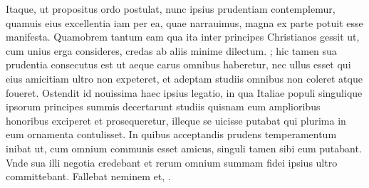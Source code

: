 \documentclass[a5paper,twoside]{article}
\begin{document}
\begin{pages}
\begin{Leftside}
Itaque, ut propositus ordo postulat, nunc ipsius prudentiam contemplemur, quamuis eius excellentia iam per ea, quae narrauimus, magna ex parte potuit esse manifesta. Quamobrem tantum eam   qua ita  inter principes Christianos gessit ut, cum unius erga   consideres, credas ab aliis minime dilectum. ; hic tamen sua prudentia consecutus est ut aeque carus omnibus haberetur, nec ullus esset qui eius amicitiam ultro non expeteret, et adeptam studiis omnibus non coleret atque foueret. Ostendit id nouissima haec ipsius legatio, in qua  Italiae populi singulique ipsorum principes summis decertarunt studiis quisnam eum amplioribus honoribus exciperet et prosequeretur, illeque se uicisse putabat qui plurima in eum ornamenta contulisset. In quibus acceptandis  prudens temperamentum inibat ut, cum omnium communis esset amicus, singuli tamen sibi eum  putabant. Vnde sua illi negotia credebant et rerum omnium summam fidei ipsius ultro committebant. Fallebat neminem et, . 
\pend
\pstart

\end{Leftside}
\end{pages}
\end{document}
